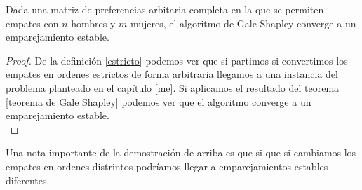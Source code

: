 \begin{cor}
Dada una matriz de preferencias arbitaria completa en la que se permiten empates con $n$ hombres y $m$ mujeres, el algoritmo de Gale Shapley converge a un emparejamiento estable.
\end{cor}
\begin{proof}
De la definición \ref{estricto} podemos ver que si partimos si convertimos los empates en ordenes estrictos de forma arbitraria llegamos a una instancia del problema planteado en el capítulo \ref{me}. Si aplicamos el resultado del teorema \ref{teorema de Gale Shapley} podemos ver que el algoritmo converge a un emparejamiento estable.  \\
\end{proof}

Una nota importante de la demostración de arriba es que si que si cambiamos los empates en ordenes distrintos podríamos llegar a emparejamientos estables diferentes. 





